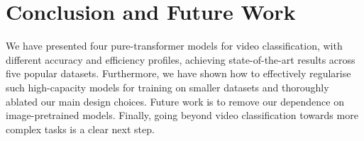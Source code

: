 \section{Conclusion and Future Work}


We have presented four pure-transformer models for video classification, with different accuracy and efficiency profiles, achieving state-of-the-art results across five popular datasets.
Furthermore, we have shown how to effectively regularise such high-capacity models for training on smaller datasets and thoroughly ablated our main design choices.
Future work is to remove our dependence on image-pretrained models.
Finally, going beyond video classification towards more complex tasks is a clear next step.